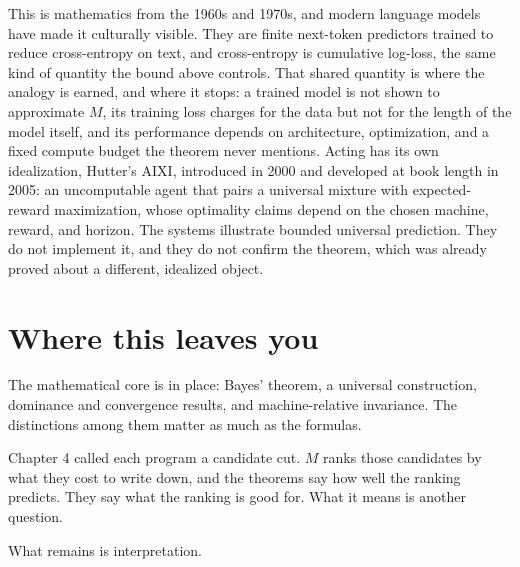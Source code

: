 This is mathematics from the 1960s and 1970s, and modern language models have made it culturally visible. They are finite next-token predictors trained to reduce cross-entropy on text, and cross-entropy is cumulative log-loss, the same kind of quantity the bound above controls. That shared quantity is where the analogy is earned, and where it stops: a trained model is not shown to approximate $M$, its training loss charges for the data but not for the length of the model itself, and its performance depends on architecture, optimization, and a fixed compute budget the theorem never mentions. Acting has its own idealization, Hutter's AIXI, introduced in 2000 and developed at book length in 2005: an uncomputable agent that pairs a universal mixture with expected-reward maximization, whose optimality claims depend on the chosen machine, reward, and horizon. The systems illustrate bounded universal prediction. They do not implement it, and they do not confirm the theorem, which was already proved about a different, idealized object.

\section*{Where this leaves you}

The mathematical core is in place: Bayes' theorem, a universal construction, dominance and convergence results, and machine-relative invariance. The distinctions among them matter as much as the formulas.

Chapter 4 called each program a candidate cut. $M$ ranks those candidates by what they cost to write down, and the theorems say how well the ranking predicts. They say what the ranking is good for. What it means is another question.

What remains is interpretation.
